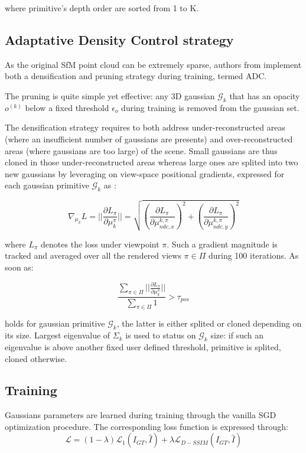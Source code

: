 where primitive’s depth order are sorted from 1 to K. \newline

\subsection{Adaptative Density Control strategy} 
As the original \ac{SfM} point cloud can be extremely sparse, authors from \citep{kerbl20233d} implement both a densification and pruning strategy during training, termed \ac{ADC}. 

The pruning is quite simple yet effective: any 3D gaussian $\mathcal{G}_{k}$ that has an opacity $o^{(k)}$ below a fixed threshold $\epsilon_{o}$ during training is removed from the gaussian set. 

The densification strategy requires to both address under-reconstructed areas (where an insufficient number of gaussians are presents) and over-reconstructed areas (where gaussians are too large) of the scene. Small gaussians are thus cloned in those under-reconstructed areas whereas large ones are splited into two new gaussians by leveraging on view-space positional gradients, expressed for each gaussian primitive $\mathcal{G}_{k}$ as : 

\begin{equation}
   \nabla_{\mu_{k}}L= ||\frac{\partial L_{\pi}}{\partial \mu_{k}^{\pi}}|| = \sqrt{\left(\frac{\partial L_{\pi}}{\partial \mu_{ndc,x}^{k,\pi}}\right)^{2} + \left(\frac{\partial L_{\pi}}{\partial \mu_{ndc,y}^{k,\pi}}\right)^{2}}
\end{equation}

where $L_{\pi}$ denotes the loss under viewpoint $\pi$. Such a gradient magnitude is tracked and averaged over all the rendered views $\pi \in \Pi$ during 100 iterations. As soon as: 

\begin{equation}
\frac{\sum \limits_{\pi \in \Pi} ||\frac{\partial L_{\pi}}{\partial \mu_{k}^{\pi}}||}{\sum \limits_{\pi \in \Pi} 1} > \tau_{pos}
\label{eq:adc-original}
\end{equation}

holds for gaussian primitive $\mathcal{G}_{k}$, the latter is either splited or cloned depending on its size. Largest eigenvalue of $\Sigma_{k}$ is used to status on $\mathcal{G}_{k}$ size: if such an eigenvalue is above another fixed user defined threshold, primitive is splited, cloned otherwise. \newline

\subsection{Training} 
Gaussians parameters are learned during training through the vanilla \ac{SGD} optimization procedure. The corresponding loss function is expressed through: 
\begin{equation}
    \mathcal{L} = (1-\lambda)\mathcal{L}_{1}(I_{GT},\hat{I}) + \lambda \mathcal{L}_{D-SSIM}(I_{GT},\hat{I})
\end{equation}

